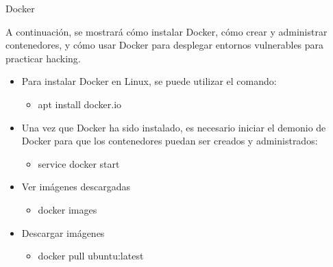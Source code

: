 \documentclass[aspectratio=169,11pt]{beamer}
\begin{document}
\begin{frame}[allowframebreaks]{Docker}
\small

  A continuación, se mostrará cómo instalar Docker, cómo crear y administrar contenedores, y cómo usar Docker para desplegar entornos vulnerables para practicar hacking.


  \begin{itemize}
  \item Para instalar Docker en Linux, se puede utilizar el comando:
  \begin{itemize}
  \item apt install docker.io
  \end{itemize}
  \item Una vez que Docker ha sido instalado, es necesario iniciar el demonio de Docker para que los contenedores puedan ser creados y administrados:
  \begin{itemize}
  \item service docker start
  \end{itemize}
  
  \item Ver imágenes descargadas
  \begin{itemize}
  \item docker images
  \end{itemize}
  
  \item Descargar imágenes
  \begin{itemize}
  \item docker pull ubuntu:latest
  \end{itemize}
  
  \end{itemize}
\end{frame}
\end{document}
